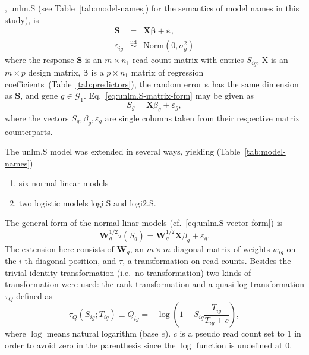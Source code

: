 \documentclass[letterpaper]{article}
\begin{document}
, unlm.S (see Table~\ref{tab:model-names}) for the semantics of
model names in this study), is
\begin{eqnarray}
\mathbf{S} &=& \mathbf{X} \boldsymbol{\beta} + \boldsymbol{\varepsilon},
\label{eq:unlm.S-matrix-form} \\
\varepsilon_{ig} &\overset{\mathrm{iid}}{\sim}& \mathrm{Norm}(0, \sigma^2_g)
\end{eqnarray}
where the response \(\mathbf{S}\) is an \(m\times n_1\) read count matrix with
entries \(S_{ig}\), \(\mathrm{X}\) is an \(m\times p\) design matrix,
\(\boldsymbol{\beta}\) is a \(p\times n_1\) matrix of regression
coefficients~(Table~\ref{tab:predictors}), the random error
\(\boldsymbol{\varepsilon}\) has the same dimension as \(\mathbf{S}\), and
gene \(g\in \mathcal{G}_1\).  Eq.~\ref{eq:unlm.S-matrix-form} may be given as
\begin{equation}
S_g = \mathbf{X} \beta_g + \varepsilon_g,
\label{eq:unlm.S-vector-form}
\end{equation}
where the vectors \(S_g, \beta_g, \varepsilon_g\)
are single columns taken from their respective matrix counterparts.

The unlm.S model was extended in several ways, yielding (Table~\ref{tab:model-names})
\begin{enumerate}
\item six normal linear models
\item two logistic models logi.S and logi2.S.
\end{enumerate}

The general form of the normal linar models
(cf.~\ref{eq:unlm.S-vector-form}) is
\begin{equation}
\mathbf{W}_g^{1/2} \tau(S_g) = \mathbf{W}_g^{1/2} \mathbf{X} \beta_g + \varepsilon_g.
\label{eq:nlm-general}
\end{equation}
The extension here consists of \(\mathbf{W}_g\), an \(m\times m\) diagonal matrix of
weights \(w_{ig}\) on the \(i\)-th diagonal position, and \(\tau\), a
transformation on read counts.  Besides the trivial identity transformation
(i.e.~no transformation) two kinds of transformation were used: the rank
transformation and a quasi-log transformation \(\tau_Q\) defined as
\begin{equation}
\tau_Q(S_{ig};T_{ig}) \equiv Q_{ig} = - \log \left( 1 - S_{ig} \frac{T_{ig}}{T_{ig} + c}
\right),
\label{eq:Q}
\end{equation}
where \(\log\) means natural logarithm (base \(e\)).  \(c\) is a pseudo read
count set to \(1\) in order to avoid zero in the parenthesis since the \(\log\)
function is undefined at \(0\).
\end{document}
